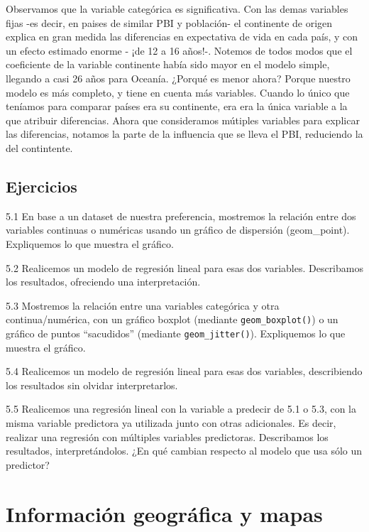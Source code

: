 \documentclass[spanish,]{book}
\begin{document}
Observamos que la variable categórica es significativa. Con las demas variables fijas -es decir, en paises de similar PBI y población- el continente de origen explica en gran medida las diferencias en expectativa de vida en cada país, y con un efecto estimado enorme - ¡de 12 a 16 años!-. Notemos de todos modos que el coeficiente de la variable continente había sido mayor en el modelo simple, llegando a casi 26 años para Oceanía. ¿Porqué es menor ahora? Porque nuestro modelo es más completo, y tiene en cuenta más variables. Cuando lo único que teníamos para comparar países era su continente, era era la única variable a la que atribuir diferencias. Ahora que consideramos mútiples variables para explicar las diferencias, notamos la parte de la influencia que se lleva el PBI, reduciendo la del contintente.

\hypertarget{ejercicios-3}{%
\section{Ejercicios}\label{ejercicios-3}}

5.1 En base a un dataset de nuestra preferencia, mostremos la relación entre dos variables continuas o numéricas usando un gráfico de dispersión (geom\_point). Expliquemos lo que muestra el gráfico.

5.2 Realicemos un modelo de regresión lineal para esas dos variables. Describamos los resultados, ofreciendo una interpretación.

5.3 Mostremos la relación entre una variables categórica y otra continua/numérica, con un gráfico boxplot (mediante \texttt{geom\_boxplot()}) o un gráfico de puntos ``sacudidos'' (mediante \texttt{geom\_jitter()}). Expliquemos lo que muestra el gráfico.

5.4 Realicemos un modelo de regresión lineal para esas dos variables, describiendo los resultados sin olvidar interpretarlos.

5.5 Realicemos una regresión lineal con la variable a predecir de 5.1 o 5.3, con la misma variable predictora ya utilizada junto con otras adicionales. Es decir, realizar una regresión con múltiples variables predictoras. Describamos los resultados, interpretándolos. ¿En qué cambian respecto al modelo que usa sólo un predictor?

\hypertarget{informaciuxf3n-geogruxe1fica-y-mapas}{%
\chapter{Información geográfica y mapas}\label{informaciuxf3n-geogruxe1fica-y-mapas}}
\end{document}
